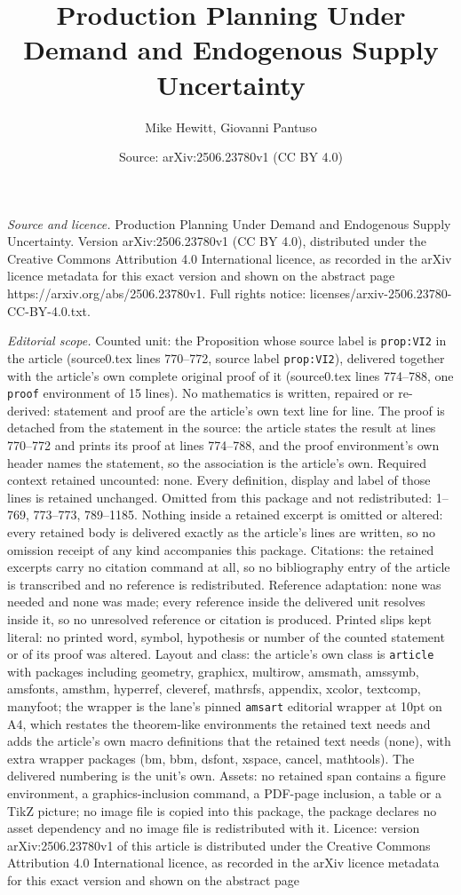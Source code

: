\documentclass[10pt,a4paper]{amsart}
\title[Production Planning Under Demand and Endogenous Supply Uncer]{Production Planning Under Demand and Endogenous Supply Uncertainty}
\author{Mike Hewitt, Giovanni Pantuso}
\date{Source: arXiv:2506.23780v1 (CC BY 4.0)}
\begin{document}
\maketitle

\noindent\emph{Source and licence.} Production Planning Under Demand and Endogenous Supply Uncertainty. Version arXiv:2506.23780v1 (CC BY 4.0), distributed under the Creative Commons Attribution 4.0 International licence, as recorded in the arXiv licence metadata for this exact version and shown on the abstract page https://arxiv.org/abs/2506.23780v1. Full rights notice: licenses/arxiv-2506.23780-CC-BY-4.0.txt.\par\smallskip

\noindent\textit{Editorial scope.} Counted unit: the Proposition whose source label is \texttt{prop:VI2} in the article (source0.tex lines 770--772, source label \texttt{prop:VI2}), delivered together with the article's own complete original proof of it (source0.tex lines 774--788, one \texttt{proof} environment of 15 lines). No mathematics is written, repaired or re-derived: statement and proof are the article's own text line for line. The proof is detached from the statement in the source: the article states the result at lines 770--772 and prints its proof at lines 774--788, and the proof environment's own header names the statement, so the association is the article's own. Required context retained uncounted: none. Every definition, display and label of those lines is retained unchanged. Omitted from this package and not redistributed: 1--769, 773--773, 789--1185. Nothing inside a retained excerpt is omitted or altered: every retained body is delivered exactly as the article's lines are written, so no omission receipt of any kind accompanies this package. Citations: the retained excerpts carry no citation command at all, so no bibliography entry of the article is transcribed and no reference is redistributed. Reference adaptation: none was needed and none was made; every reference inside the delivered unit resolves inside it, so no unresolved reference or citation is produced. Printed slips kept literal: no printed word, symbol, hypothesis or number of the counted statement or of its proof was altered. Layout and class: the article's own class is \texttt{article} with packages including geometry, graphicx, multirow, amsmath, amssymb, amsfonts, amsthm, hyperref, cleveref, mathrsfs, appendix, xcolor, textcomp, manyfoot; the wrapper is the lane's pinned \texttt{amsart} editorial wrapper at 10pt on A4, which restates the theorem-like environments the retained text needs and adds the article's own macro definitions that the retained text needs (none), with extra wrapper packages (bm, bbm, dsfont, xspace, cancel, mathtools). The delivered numbering is the unit's own. Assets: no retained span contains a figure environment, a graphics-inclusion command, a PDF-page inclusion, a table or a TikZ picture; no image file is copied into this package, the package declares no asset dependency and no image file is redistributed with it. Licence: version arXiv:2506.23780v1 of this article is distributed under the Creative Commons Attribution 4.0 International licence, as recorded in the arXiv licence metadata for this exact version and shown on the abstract page 
\end{document}
